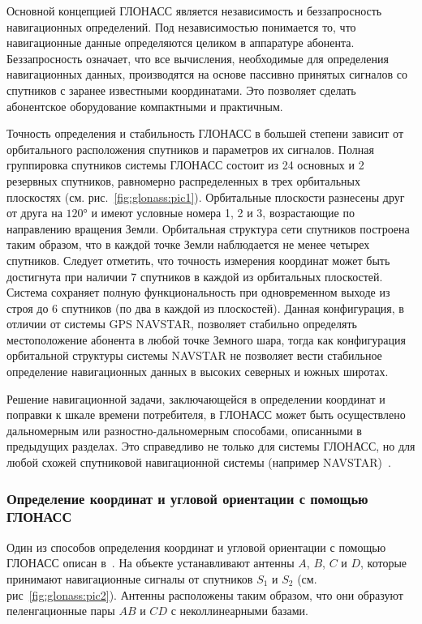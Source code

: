 \documentclass[../main.tex]{subfiles}
\begin{document}
Основной концепцией ГЛОНАСС является независимость и беззапросность навигационных определений. Под независимостью понимается то, что навигационные данные определяются целиком в аппаратуре абонента. Беззапросность означает, что все вычисления, необходимые для определения навигационных данных, производятся на основе пассивно принятых сигналов со спутников с заранее известными координатами. Это позволяет сделать абонентское оборудование компактными и практичным.

Точность определения и стабильность ГЛОНАСС в большей степени зависит от орбитального расположения спутников и параметров их сигналов. Полная группировка спутников системы ГЛОНАСС состоит из 24 основных и 2 резервных спутников, равномерно распределенных в трех орбитальных плоскостях (см. рис.~\ref{fig:glonass:pic1}). Орбитальные плоскости разнесены друг от друга на $\ang{120}$ и имеют условные номера 1, 2 и 3, возрастающие по направлению вращения Земли. Орбитальная структура сети спутников построена таким образом, что в каждой точке Земли наблюдается не менее четырех спутников. Следует отметить, что точность измерения координат может быть достигнута при наличии 7 спутников в каждой из орбитальных плоскостей. Система сохраняет полную функциональность при одновременном выходе из строя до 6 спутников (по два в каждой из плоскостей). Данная конфигурация, в отличии от системы GPS NAVSTAR, позволяет стабильно определять местоположение абонента в любой точке Земного шара, тогда как конфигурация орбитальной структуры системы NAVSTAR не позволяет вести стабильное определение навигационных данных в высоких северных и южных широтах.

Решение навигационной задачи, заключающейся в определении координат и поправки к шкале времени потребителя, в ГЛОНАСС может быть осуществлено дальномерным или разностно-дальномерным способами, описанными в предыдущих разделах. Это справедливо не только для системы ГЛОНАСС, но для любой схожей спутниковой навигационной системы (например NAVSTAR)~\cite{GOST-GLONASS:2009}.

\subsubsection{Определение координат и угловой ориентации с помощью ГЛОНАСС}
Один из способов определения координат и угловой ориентации с помощью ГЛОНАСС описан в~\cite{STEPANOV:2006}. На объекте устанавливают антенны $A$, $B$, $C$ и $D$, которые принимают навигационные сигналы от спутников $S_1$ и $S_2$ (см. рис~\ref{fig:glonass:pic2}). Антенны расположены таким образом, что они образуют пеленгационные пары $AB$ и $CD$ с неколлинеарными базами.
\end{document}
